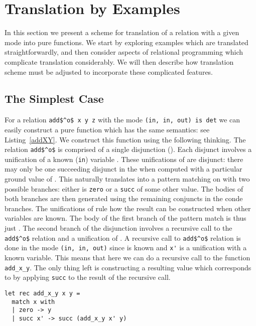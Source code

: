 \section{Translation by Examples}

In this section we present a scheme for translation of a \mk relation with a given mode into pure functions.
We start by exploring examples which are translated straightforwardly, and then consider aspects of relational programming which complicate translation considerably.
We will then describe how translation scheme must be adjusted to incorporate these complicated features.

\subsection{The Simplest Case}

For a relation \lstinline{add$^o$ x y z} with the mode \lstinline{(in, in, out) is det} we can easily construct a pure function which has the same semantics: see Listing~\ref{addXY}.
We construct this function using the following thinking.
The relation \lstinline{add$^o$} is comprised of a single disjunction (\conde).
Each disjunct involves a unification of a known (\lstinline{in}) variable \x.
These unifications of \x are disjunct: there may only be one succeeding disjunct in the \conde when computed with a particular ground value of \x.
This naturally translates into a pattern matching on \x with two possible branches: either \x is \lstinline{zero} or a \lstinline{succ} of some other value.
The bodies of both branches are then generated using the remaining conjuncts in the conde branches.
The unifications of \z rule how the result can be constructed when other variables are known.
The body of the first branch of the pattern match is thus just \y.
The second branch of the disjunction involves a recursive call to the \lstinline{add$^o$} relation and a unification of \z.
A recursive call to \lstinline{add$^o$} relation is done in the mode \lstinline{(in, in, out)} since \y is known and \lstinline{x'} is a unification with a known variable.
This means that here we can do a recursive call to the function \lstinline{add_x_y}.
The only thing left is constructing a resulting value which corresponds to \z by applying \lstinline{succ} to the result of the recursive call.

\begin{figure*}[!t]
  \centering
  \begin{minipage}{0.68\textwidth}
    \begin{lstlisting}[label={addXY}, caption={Functional representation of \lstinline{addo x y z} with the mode \lstinline{(in, in, out) is det}}, captionpos=b, frame=tb]
let rec add_x_y x y =
  match x with
  | zero -> y
  | succ x' -> succ (add_x_y x' y)
    \end{lstlisting}
  \end{minipage}
\end{figure*}


